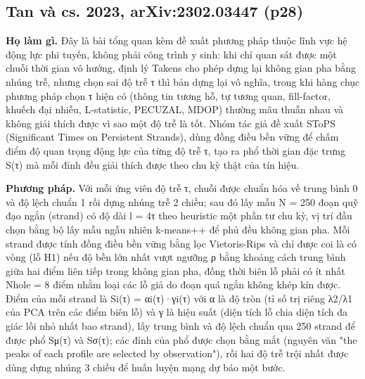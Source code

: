 \documentclass[12pt,a4paper]{article}
\begin{document}
\subsection{Tan và cs. 2023, arXiv:2302.03447 \normalfont\small (p28)}
\par\vspace{2pt}
\par\vspace{4pt}
\noindent \textbf{Họ làm gì.} Đây là bài tổng quan kèm đề xuất phương pháp thuộc lĩnh vực hệ động lực phi tuyến, không phải công trình y sinh: khi chỉ quan sát được một chuỗi thời gian vô hướng, định lý Takens cho phép dựng lại không gian pha bằng nhúng trễ, nhưng chọn sai độ trễ τ thì bản dựng lại vô nghĩa, trong khi hàng chục phương pháp chọn τ hiện có (thông tin tương hỗ, tự tương quan, fill-factor, khuếch đại nhiễu, L-statistic, PECUZAL, MDOP) thường mâu thuẫn nhau và không giải thích được vì sao một độ trễ là tốt. Nhóm tác giả đề xuất SToPS (Significant Times on Persistent Strands), dùng đồng điều bền vững để chấm điểm độ quan trọng động lực của từng độ trễ τ, tạo ra phổ thời gian đặc trưng S(τ) mà mỗi đỉnh đều giải thích được theo chu kỳ thật của tín hiệu.\par\vspace{3pt}
\noindent \textbf{Phương pháp.} Với mỗi ứng viên độ trễ τ, chuỗi được chuẩn hóa về trung bình 0 và độ lệch chuẩn 1 rồi dựng nhúng trễ 2 chiều; sau đó lấy mẫu N = 250 đoạn quỹ đạo ngắn (strand) có độ dài l = 4τ theo heuristic một phần tư chu kỳ, vị trí đầu chọn bằng bộ lấy mẫu ngẫu nhiên k-means++ để phủ đều không gian pha. Mỗi strand được tính đồng điều bền vững bằng lọc Vietoris-Rips và chỉ được coi là có vòng (lỗ H1) nếu độ bền lớn nhất vượt ngưỡng ρ bằng khoảng cách trung bình giữa hai điểm liên tiếp trong không gian pha, đồng thời biên lỗ phải có ít nhất Nhole = 8 điểm nhằm loại các lỗ giả do đoạn quá ngắn không khép kín được. Điểm của mỗi strand là Si(τ) = αi(τ)·γi(τ) với α là độ tròn (tỉ số trị riêng λ2/λ1 của PCA trên các điểm biên lỗ) và γ là hiệu suất (diện tích lỗ chia diện tích đa giác lồi nhỏ nhất bao strand), lấy trung bình và độ lệch chuẩn qua 250 strand để được phổ Sμ(τ) và Sσ(τ); các đỉnh của phổ được chọn bằng mắt (nguyên văn "the peaks of each profile are selected by observation"), rồi hai độ trễ trội nhất được dùng dựng nhúng 3 chiều để huấn luyện mạng dự báo một bước.\par\vspace{3pt}
\end{document}
